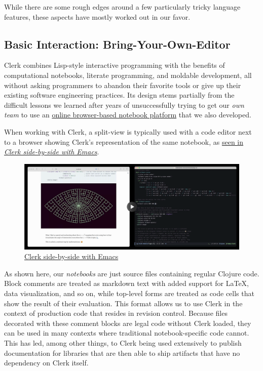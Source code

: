 \documentclass[sigconf,screen]{acmart}
\begin{document}
While there are some rough edges around a few particularly tricky language features, these aspects have mostly worked out in our favor.

\hypertarget{id}{%
\subsection{Basic Interaction: Bring-Your-Own-Editor}\label{id}}

Clerk combines Lisp-style interactive programming with the benefits of computational notebooks, literate programming, and moldable development, all without asking programmers to abandon their favorite tools or give up their existing software engineering practices. Its design stems partially from the difficult lessons we learned after years of unsuccessfully trying to get our \emph{own team} to use an \href{https://nextjournal.com}{online browser-based notebook platform} that we also developed.

When working with Clerk, a split-view is typically used with a code editor next to a browser showing Clerk's representation of the same notebook, as \protect\hyperlink{clerk-side-by-side-with-emacs}{seen in \emph{Clerk side-by-side with Emacs}}.

\begin{figure}[H]
\centering
\includegraphics{images/clerk-side-by-side-with-emacs.png}
\caption{\href{https://cdn.nextjournal.com/data/QmUwPGsUfvZhWo7jNCfq92hDhGMu2hNsVRq6sUVrVXdsfq?content-type=image/png}{Clerk side-by-side with Emacs}}
\end{figure}

As shown here, our \emph{notebooks} are just source files containing regular Clojure code. Block comments are treated as markdown text with added support for LaTeX, data visualization, and so on, while top-level forms are treated as code cells that show the result of their evaluation. This format allows us to use Clerk in the context of production code that resides in revision control. Because files decorated with these comment blocks are legal code without Clerk loaded, they can be used in many contexts where traditional notebook-specific code cannot. This has led, among other things, to Clerk being used extensively to publish documentation for libraries that are then able to ship artifacts that have no dependency on Clerk itself.
\end{document}
